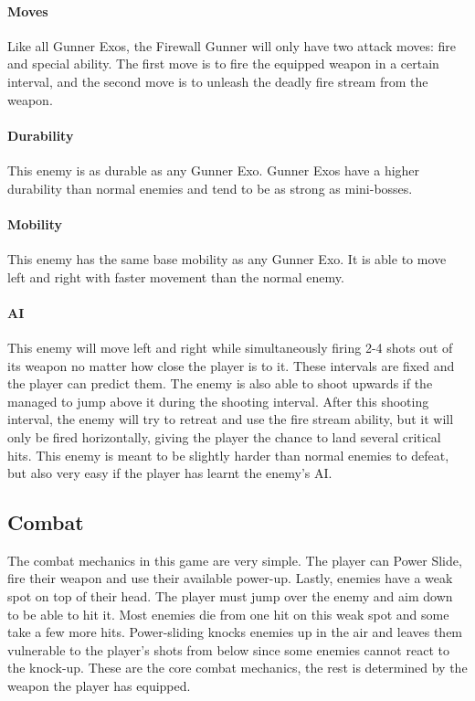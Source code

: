 \documentclass[12pt]{article}
\begin{document}
\paragraph{Moves}

Like all Gunner Exos, the Firewall Gunner will only have two attack moves: fire and special ability. The first move is to fire the equipped weapon in a certain interval, and the second move is to unleash the deadly fire stream from the weapon.

\paragraph{Durability}

This enemy is as durable as any Gunner Exo. Gunner Exos have a higher durability than normal enemies and tend to be as strong as mini-bosses. 

\paragraph{Mobility}

This enemy has the same base mobility as any Gunner Exo. It is able to move left and right with faster movement than the normal enemy.

\paragraph{AI}

This enemy will move left and right while simultaneously firing 2-4 shots out of its weapon no matter how close the player is to it. These intervals are fixed and the player can predict them. The enemy is also able to shoot upwards if the managed to jump above it during the shooting interval. After this shooting interval, the enemy will try to retreat and use the fire stream ability, but it will only be fired horizontally, giving the player the chance to land several critical hits. This enemy is meant to be slightly harder than normal enemies to defeat, but also very easy if the player has learnt the enemy's AI. 

\subsection{Combat}

The combat mechanics in this game are very simple. The player can Power Slide, fire their weapon and use their available power-up. Lastly, enemies have a weak spot on top of their head. The player must jump over the enemy and aim down to be able to hit it. Most enemies die from one hit on this weak spot and some take a few more hits. Power-sliding knocks enemies up in the air and leaves them vulnerable to the player's shots from below since some enemies cannot react to the knock-up.
These are the core combat mechanics, the rest is determined by the weapon the player has equipped.
\end{document}
